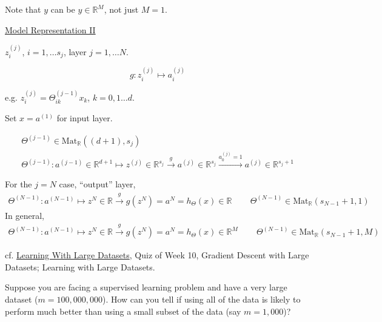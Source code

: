 \documentclass[10pt]{amsart}
\begin{document}
\begin{multicols*}{2}
Note that $y$ can be $y \in \mathbb{R}^M$, not just $M=1$.


\href{https://www.coursera.org/learn/machine-learning/supplement/YlEVx/model-representation-ii}{Model Representation II}

$z_i^{(j)}$, $i=1, \dots s_j$, layer $j=1, \dots N$.

\begin{equation}
  g: z_i^{(j)} \mapsto a_i^{(j)}
  \end{equation}

e.g. $z_i^{(j)} = \Theta_{ik}^{(j-1)} x_k$, $k=0,1\dots d$.

Set $x=a^{(1)}$ for input layer.

\begin{equation}
  \begin{gathered}
    \Theta^{(j-1)} \in \text{Mat}_{\mathbb{R}}( (d+1), s_j) \\
    \Theta^{(j-1)} : a^{(j-1)} \in \mathbb{R}^{d+1} \mapsto z^{(j)} \in \mathbb{R}^{s_j} \xrightarrow{ g} a^{(j)} \in \mathbb{R}^{s_j} \xrightarrow{ a_0^{(j)} = 1 } a^{(j)} \in \mathbb{R}^{s_j + 1}
    \end{gathered}
  \end{equation}

For the $j=N$ case, ``output'' layer,
\begin{equation}
\begin{gathered}
  \Theta^{(N-1)} : a^{(N-1)} \mapsto z^N \in \mathbb{R} \xrightarrow{ g} g(z^N) = a^N = h_{\Theta}(x) \in \mathbb{R} \qquad \, \Theta^{(N-1)} \in \text{Mat}_{\mathbb{R}}( s_{N-1} +1, 1)
  \end{gathered}
  \end{equation}
In general,
\[
\begin{gathered}
  \Theta^{(N-1)} : a^{(N-1)} \mapsto z^N \in \mathbb{R} \xrightarrow{ g} g(z^N) = a^N = h_{\Theta}(x) \in \mathbb{R}^M \qquad \, \Theta^{(N-1)} \in \text{Mat}_{\mathbb{R}}( s_{N-1} +1, M)
\end{gathered}
\]



cf. \href{https://www.coursera.org/learn/machine-learning/lecture/CipHf/learning-with-large-datasets}{Learning With Large Datasets}, Quiz of Week 10, Gradient Descent with Large Datasets; Learning with Large Datasets.

Suppose you are facing a supervised learning problem and have a very large dataset ($m=100,000,000$).  How can you tell if using all of the data is likely to perform much better than using a small subset of the data (say $m=1,000$)?


\end{multicols*}
\end{document}
